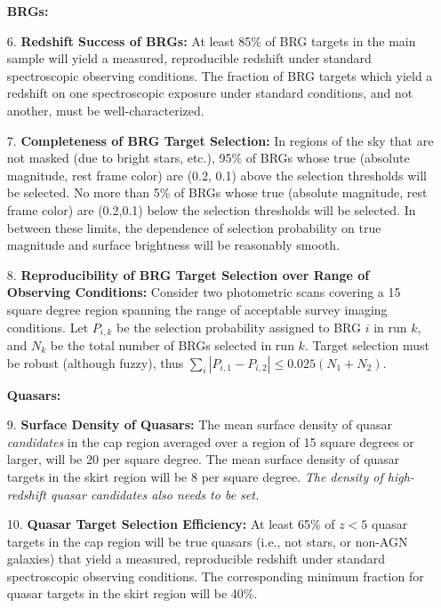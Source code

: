 \begin{enumerate}
\centerline{\bf BRGs:}
\item[6.] {\bf Redshift Success of BRGs:} At least 85\% of BRG targets
in the main sample will yield a measured, reproducible redshift under
standard spectroscopic observing conditions.  The fraction
of BRG targets which yield a redshift on one spectroscopic exposure under
standard conditions, and not another, must be well-characterized. 
\item[7.] {\bf Completeness of BRG Target Selection:} In regions of
the sky that are not masked (due to bright stars, etc.), 
95\% of BRGs whose true (absolute magnitude, rest frame color) are (0.2, 0.1)
above the selection thresholds will be selected.
No more than 5\% of BRGs whose true (absolute magnitude, rest frame color) are
(0.2,0.1) below the selection thresholds will
be selected. In between these limits, the dependence of selection probability
on true magnitude and surface brightness will be reasonably smooth.
\item[8.] {\bf Reproducibility of BRG Target Selection over Range
of Observing Conditions:} Consider two photometric scans covering a 
15 square degree region spanning
the range of acceptable survey imaging conditions.  Let $P_{i,k}$ be
the selection probability assigned to BRG $i$ in run $k$, and $N_k$
be the total number of BRGs selected in run $k$.  Target
selection must be robust (although fuzzy), thus $\sum_i|P_{i,1} - P_{i,2}| \le 0.025(N_1
+ N_2)$. 

\centerline{\bf Quasars:}
\item[9.] {\bf Surface Density of Quasars:} The mean surface density
of quasar {\it candidates} 
in the cap region averaged over a region of 15 square degrees or
larger, 
will be $20$ per square degree. 
The mean surface density of quasar targets in the skirt region will
be $8$ per square degree. {\it The density of high-redshift quasar
candidates also needs to be set.}
\item[10.] {\bf Quasar Target Selection Efficiency:} At least 65\% of
$z < 5$ quasar targets in the cap region will be 
true quasars (i.e., not stars, or non-AGN galaxies) that yield
a measured, reproducible redshift under standard spectroscopic
observing conditions.  The corresponding minimum fraction for
quasar targets in the skirt region will be 40\%.  


\end{enumerate}
